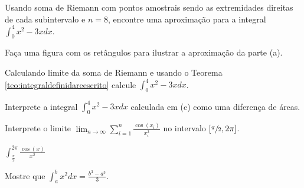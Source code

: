 \begin{exercises}

\begin{exercise}
\begin{alphalist}
    \item Usando soma de Riemann com pontos amostrais sendo as
      extremidades direitas de cada subintervalo e $n=8$, encontre
      uma aproximação para a integral \(\int_0^4 x^2-3x dx\).
    \item Faça uma figura com os retângulos para ilustrar a
      aproximação da parte (a).
    \item Calculando limite da soma de Riemann e usando o
      Teorema \ref{teo:integraldefinidareescrito}
      calcule \(\int_0^4 x^2-3x dx\).
    \item Interprete a integral \(\int_0^4 x^2-3x dx\) calculada em (c)
      como uma diferença de áreas.
\end{alphalist}
\end{exercise}
\begin{exercise}
  Interprete o limite
  \(
    \lim_{n \to \infty} \sum_{i=1}^{n} \frac{\cos(x_i)}{x_i^2}
  \)
  no intervalo
  \(
    \left[\sfrac{\pi}{2}, 2\pi\right]
  \).
\begin{answer}
  \(
    \int_{\frac{\pi}{2}}^{2\pi} \frac{\cos(x)}{x^2}
  \)
\end{answer}
\end{exercise}

\begin{exercise}
  Mostre que \(\int_a^b x^2 dx = \frac{b^3-a^3}{3}\).
\end{exercise}


\end{exercises}

